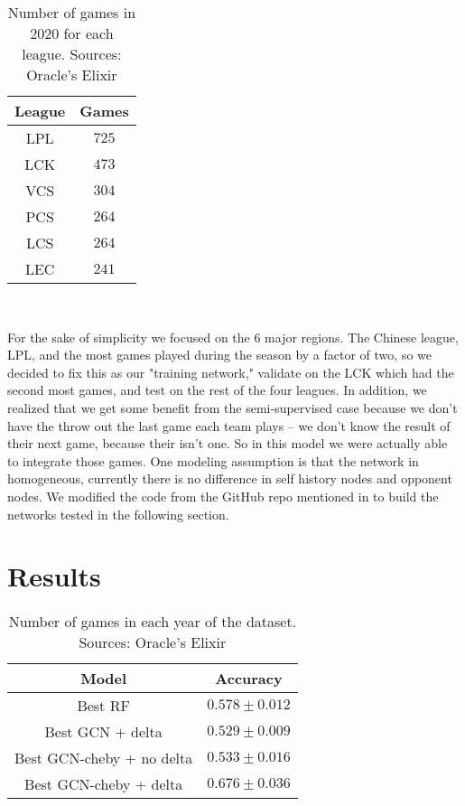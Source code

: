 \documentclass{article}
\begin{document}
\begin{table}[h!]
    \begin{centering}
    \begin{tabular}{|c|c|} \hline
        League & Games \\ \hline
        LPL & $725$  \\ \hline
        LCK & $473$ \\ \hline
        VCS & $304$ \\ \hline
        PCS & $264$ \\ \hline
        LCS & $264$ \\ \hline
        LEC & $241$ \\ \hline
    \end{tabular} \\[10pt]
    \caption{Number of games in 2020 for each league. Sources: Oracle's Elixir}
    \end{centering}
\end{table}

For the sake of simplicity we focused on the 6 major regions. 
The Chinese league, LPL, and the most games played during the season by a factor of two, so we decided to fix this as our "training network," validate on the LCK which had the second most games, and test on the rest of the four leagues. 
In addition, we realized that we get some benefit from the semi-supervised case because we don't have the throw out the last game each team plays -- we don't know the result of their next game, because their isn't one.
So in this model we were actually able to integrate those games.
One modeling assumption is that the network in homogeneous, currently there is no difference in self history nodes and opponent nodes.
We modified the code from the GitHub repo mentioned in \cite{Kipf2017} to build the networks tested in the following section.

\section{Results}

\begin{table}[h!]
    \begin{centering}
    \begin{tabular}{|c|c|} \hline
        \textbf{Model} & \textbf{Accuracy} \\ \hline 
        Best RF & $0.578 \pm 0.012$  \\ \hline
        Best GCN + delta & $0.529 \pm 0.009$  \\ \hline
        Best GCN-cheby + no delta & $0.533 \pm 0.016$  \\ \hline
        Best GCN-cheby + delta & $\mathbf{0.676 \pm 0.036}$ \\ \hline
    \end{tabular} \\[10pt]
    \caption{Number of games in each year of the dataset. Sources: Oracle's Elixir}
    \end{centering}
\end{table}
\end{document}
